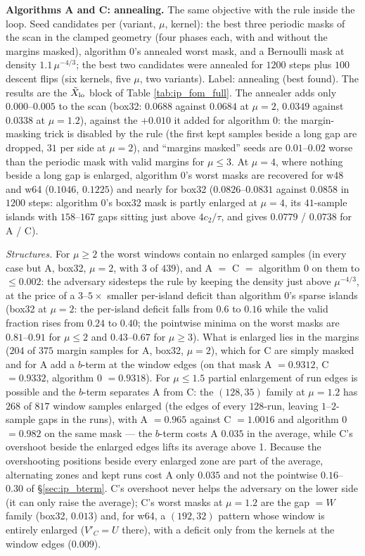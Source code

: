 \documentclass{article}
\numberwithin{equation}{section}   %
\begin{document}
{\bf Algorithms A and C: annealing.}  The same objective with the rule inside the loop.  Seed
candidates per (variant, $\mu$, kernel): the best three periodic masks of the scan in the clamped
geometry (four phases each, with and without the margins masked), algorithm 0's annealed worst mask, and
a Bernoulli mask at density $1.1\,\mu^{-4/3}$; the best two candidates were annealed for $1200$ steps plus
$100$ descent flips (six kernels, five $\mu$, two variants).  Label: annealing (best found).  The results
are the $\tilde X_{\rm lo}$ block of Table \ref{tab:ip_fom_full}.  The annealer adds only $0.000$--$0.005$ to
the scan (box32: $0.0688$ against $0.0684$ at $\mu = 2$, $0.0349$ against $0.0338$ at $\mu = 1.2$), against
the $+0.010$ it added for algorithm 0: the margin-masking trick is disabled by the rule (the first kept
samples beside a long gap are dropped, $31$ per side at $\mu = 2$), and ``margins masked'' seeds are
$0.01$--$0.02$ worse than the periodic mask with valid margins for $\mu \le 3$.  At $\mu = 4$, where
nothing beside a long gap is enlarged, algorithm 0's worst masks are recovered for w48 and w64
($0.1046$, $0.1225$) and nearly for box32 ($0.0826$--$0.0831$ against $0.0858$ in $1200$ steps: algorithm 0's
box32 mask is partly enlarged at $\mu = 4$, its $41$-sample islands with $158$--$167$ gaps sitting just
above $4c_2/\tau$, and gives $0.0779$ / $0.0738$ for A / C).

{\em Structures.}  For $\mu \ge 2$ the worst windows contain no enlarged samples (in every case but A,
box32, $\mu = 2$, with $3$ of $439$), and A $=$ C $=$ algorithm 0 on them to $\le 0.002$: the adversary
sidesteps the rule by keeping the density just above $\mu^{-4/3}$, at the price of a $3$--$5\times$
smaller per-island deficit than algorithm 0's sparse islands (box32 at $\mu = 2$: the per-island deficit
falls from $0.6$ to $0.16$ while the valid fraction rises from $0.24$ to $0.40$; the pointwise minima on
the worst masks are $0.81$--$0.91$ for $\mu \le 2$ and $0.43$--$0.67$ for $\mu \ge 3$).  What is enlarged
lies in the margins ($204$ of $375$ margin samples for A, box32, $\mu = 2$), which for C are simply masked
and for A add a $b$-term at the window edges (on that mask A $= 0.9312$, C $= 0.9332$,
algorithm 0 $= 0.9318$).  For $\mu \le 1.5$ partial enlargement of run edges is possible and the $b$-term
separates A from C: the $(128, 35)$ family at $\mu = 1.2$ has $268$ of $817$ window samples enlarged (the
edges of every $128$-run, leaving $1$--$2$-sample gaps in the runs), with A $= 0.965$ against C $= 1.0016$
and algorithm 0 $= 0.982$ on the same mask --- the $b$-term costs A $0.035$ in the average, while C's
overshoot beside the enlarged edges lifts its average above 1.  Because the overshooting positions
beside every enlarged zone are part of the average, alternating zones and kept runs cost A only $0.035$
and not the pointwise $0.16$--$0.30$ of \S\ref{sec:ip_bterm}.  C's overshoot never helps the adversary on
the lower side (it can only raise the average); C's worst masks at $\mu = 1.2$ are the gap $= W$ family
(box32, $0.013$) and, for w64, a $(192, 32)$ pattern whose window is entirely enlarged ($V'_C = U$ there),
with a deficit only from the kernels at the window edges ($0.009$).
\end{document}
